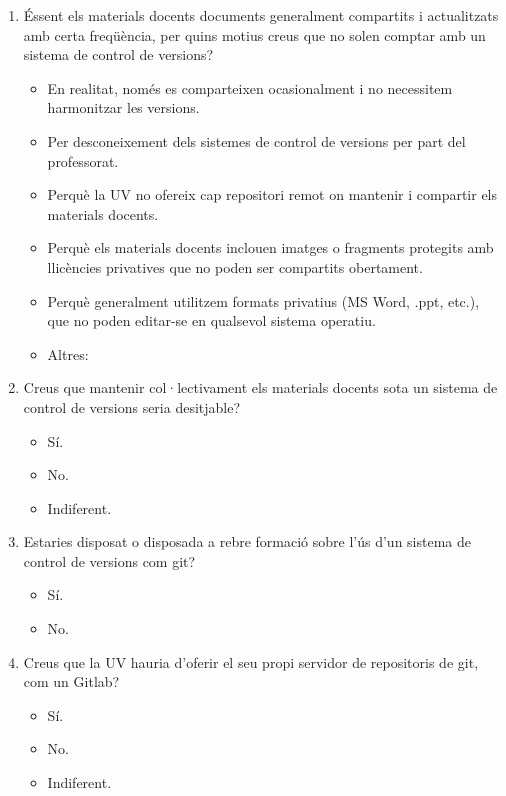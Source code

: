 \documentclass[a4paper,12pt]{article}
\begin{document}
\begin{enumerate}
   \begin{enumerate}
   \item Éssent els materials docents documents generalment compartits i actualitzats amb certa
         freqüència, per quins motius creus que no solen comptar amb un sistema de control de
         versions?
      \begin{itemize}
      \item En realitat, només es comparteixen ocasionalment i no necessitem harmonitzar les versions.
      \item Per desconeixement dels sistemes de control de versions per part del professorat.
      \item Perquè la UV no ofereix cap repositori remot on mantenir i compartir els materials
            docents.
      \item Perquè els materials docents inclouen imatges o fragments protegits amb llicències
            privatives que no poden ser compartits obertament.
      \item Perquè generalment utilitzem formats privatius (MS Word, .ppt, etc.), que no poden
            editar-se en qualsevol sistema operatiu.
      \item Altres:
      \vspace*{1cm}
      \end{itemize}
   \item Creus que mantenir col·lectivament els materials docents sota un sistema de control de
         versions seria desitjable?
      \begin{itemize}
      \item Sí.
      \item No.
      \item Indiferent.
      \end{itemize}

   \item Estaries disposat o disposada a rebre formació sobre l'ús d'un sistema de control de versions
         com \textsf{git}?
      \begin{itemize}
      \item Sí.
      \item No.
      \end{itemize}

   \item Creus que la UV hauria d'oferir el seu propi  servidor de repositoris de \textsf{git}, com
         un Gitlab? \cite{Paderborn2023,PereiraBraga2023}
      \begin{itemize}
      \item Sí.
      \item No.
      \item Indiferent.
      \end{itemize}
   \end{enumerate}


\end{enumerate}
\end{document}
